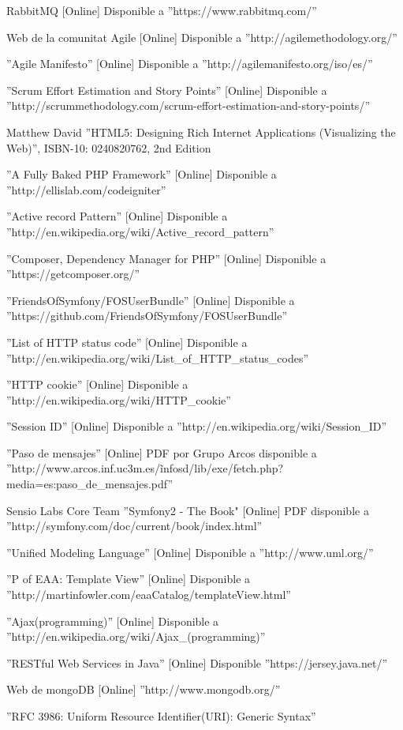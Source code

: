 \begin{thebibliography}{100}
 RabbitMQ [Online] Disponible a ''https://www.rabbitmq.com/''

 Web de la comunitat Agile [Online] Disponible a ''http://agilemethodology.org/''

 ''Agile Manifesto'' [Online] Disponible a ''http://agilemanifesto.org/iso/es/''

 ''Scrum Effort Estimation and Story Points'' [Online] Disponible a ''http://scrummethodology.com/scrum-effort-estimation-and-story-points/''

 Matthew David ''HTML5: Designing Rich Internet Applications (Visualizing the Web)'', ISBN-10: 0240820762, 2nd Edition

 ''A Fully Baked PHP Framework'' [Online] Disponible a ''http://ellislab.com/codeigniter''

 ''Active record Pattern'' [Online] Disponible a ''http://en.wikipedia.org/wiki/Active\_record\_pattern''

 ''Composer, Dependency Manager for PHP'' [Online] Disponible a ''https://getcomposer.org/''

 ''FriendsOfSymfony/FOSUserBundle'' [Online] Disponible a ''https://github.com/FriendsOfSymfony/FOSUserBundle''

 ''List of HTTP status code'' [Online] Disponible a ''http://en.wikipedia.org/wiki/List\_of\_HTTP\_status\_codes''

 ''HTTP cookie'' [Online] Disponible a ''http://en.wikipedia.org/wiki/HTTP\_cookie''

 ''Session ID'' [Online] Disponible a ''http://en.wikipedia.org/wiki/Session\_ID''

 ''Paso de mensajes'' [Online] PDF por Grupo Arcos disponible a  ''http://www.arcos.inf.uc3m.es/\~infosd/lib/exe/fetch.php?media=es:paso\_de\_mensajes.pdf''

 Sensio Labs Core Team ''Symfony2 - The Book" [Online] PDF disponible a  ''http://symfony.com/doc/current/book/index.html''

 ''Unified Modeling Language'' [Online] Disponible a ''http://www.uml.org/''

 ''P of EAA: Template View'' [Online] Disponible a ''http://martinfowler.com/eaaCatalog/templateView.html''

 ''Ajax(programming)'' [Online] Disponible a ''http://en.wikipedia.org/wiki/Ajax\_(programming)''

 ''RESTful Web Services in Java'' [Online] Disponible ''https://jersey.java.net/''

 Web de mongoDB [Online] ''http://www.mongodb.org/''

 ''RFC 3986: Uniform Resource Identifier(URI): Generic Syntax''
\end{thebibliography}